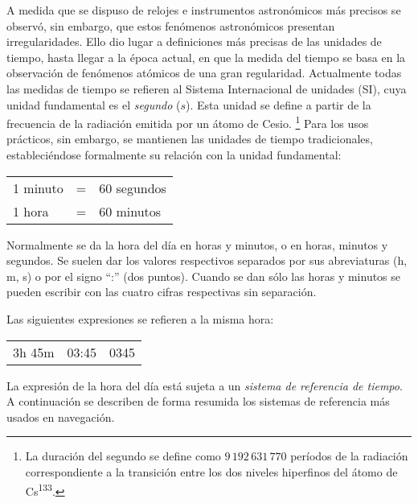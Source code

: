 A medida que se dispuso de relojes e instrumentos astronómicos más precisos se observó, sin embargo, que estos fenómenos astronómicos presentan irregularidades. Ello dio lugar a definiciones más precisas de las unidades de tiempo, hasta llegar a la época actual, en que la medida del tiempo se basa en la observación de fenómenos atómicos de 
una gran regularidad. Actualmente todas las medidas de tiempo se refieren al Sistema Internacional de unidades (SI),  cuya unidad fundamental es el \emph{segundo} ($s$). Esta unidad se define a partir de la frecuencia de la radiación emitida por un átomo de Cesio.%
\footnote{La duración del segundo se define como $9\,192\,631\,770$ períodos de la radiación correspondiente a la transición entre los dos niveles hiperfinos del átomo de Cs\textsuperscript{133}. }
Para los usos prácticos, sin embargo, se mantienen las unidades de tiempo tradicionales, estableciéndose formalmente su relación con la unidad fundamental: 

\begin{tabular}{lcl}
1 minuto &= &60 segundos\\
1 hora     &= &60 minutos\\
\end{tabular}

Normalmente se da la hora del día en horas y minutos, o en horas, minutos y segundos. Se suelen dar los valores respectivos separados por sus abreviaturas (h, m, s) o por el signo “:” (dos puntos). Cuando se dan sólo las horas y minutos se pueden escribir con las cuatro cifras respectivas sin separación. 

\begin{ejemplo}
Las siguientes expresiones se refieren a la misma hora: 

\begin{center}
\begin{tabular}{lll}
3h 45m & 03:45 & 0345 \\
\end{tabular}
\end{center}
\end{ejemplo}


La expresión de la hora del día está sujeta a un \emph{sistema de referencia de tiempo}. A continuación se describen de forma resumida los sistemas de referencia más usados en navegación. 

